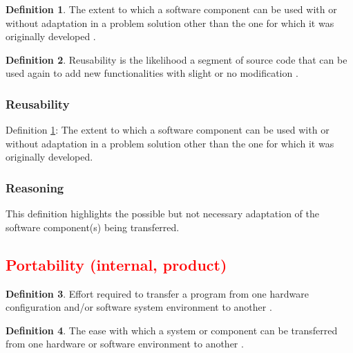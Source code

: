 \documentclass[letterpaper, cleveref]{lipics-v2019}
\newcommand{\authornote}[3]{\textcolor{#1}{[#3 ---#2]}}
\newcommand{\authornote}[3]{}
\newcommand{\pmi}[1]{\authornote{green}{PM}{#1}} %
\newcommand{\notdone}[1]{\textcolor{red}{#1}}
\theoremstyle{definition}
\newtheorem{defn}{Definition}
\begin{document}
\begin{defn} \label{ReusabilityDefnSelected}
  The extent to which a software component can be used with or without
  adaptation in a problem solution other than the one for which it was
  originally developed \citep{kalagiakos2003non}.
\end{defn}

\begin{defn}
  Reusability is the likelihood a segment of source code that can be used
  again to add new functionalities with slight or no modification
  \citep{sandhu2010survey}.
\end{defn}

\begin{mybox}
\subsubsection*{Reusability}
Definition \ref{ReusabilityDefnSelected}: The extent to which a software
component can be used with or without adaptation in a problem solution other
than the one for which it was originally developed.
\end{mybox}

\subsubsection*{Reasoning}

This definition highlights the possible but not necessary adaptation of the
software component(s) being transferred.


\subsection{\notdone{Portability (internal, product)}} %

\begin{defn} \label{PortabilityDefnSelected}
  Effort required to transfer a program from one hardware configuration
  and/or software system environment to another \citep{McCallEtAl1977}.
\end{defn}

\begin{defn}
  The ease with which a system or component can be transferred from one
  hardware or software environment to another \citep{IEEEStdGlossarySET1990}.
\end{defn}
\end{document}

